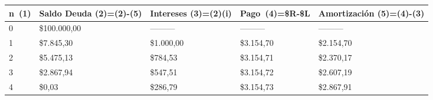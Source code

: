\begin{itemize}
		
	\begin{spacing}{1.1}
    \begin{center}
        \begin{tabular}{|p{1cm}|p{2cm}|p{2.1cm}|p{2cm}|p{3cm}|}
        \hline 
        \rowcolor{white!50}
            \textbf{n\ (1)} & \textbf{Saldo Deuda (2)=(2)-(5)} & \textbf{Intereses  (3)=(2)(i)}& \textbf{Pago\ (4)=\$R-\$L }& \textbf{Amortización  (5)=(4)-(3)} \\ \hline                        

            0 & \$100.000,00 & --------- & --------- & ---------\\ \hline 
            1 & \$7.845,30  & \$1.000,00  & \$3.154,70  & \$2.154,70 \\ \hline
            2 & \$5.475,13  & \$784,53  & \$3.154,71  & \$2.370,17 \\ \hline
            3 & \$2.867,94 & \$547,51  & \$3.154,72 & \$2.607,19 \\ \hline
            4 & \$0,03  & \$286,79  & \$3.154,73  & \$2.867,91 \\ \hline
    \end{tabular}
    \end{center}
    \end{spacing}
    \end{itemize}
    

